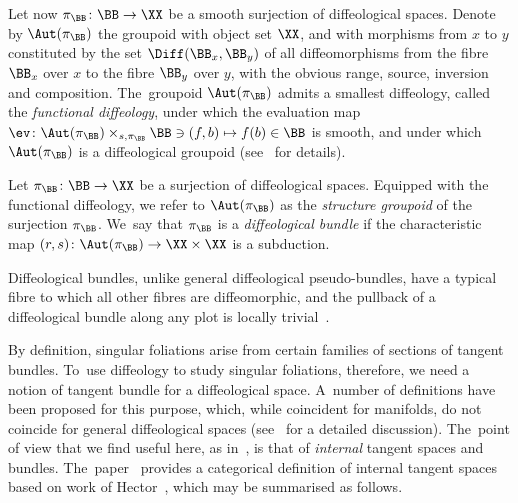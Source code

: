 Let now $\pi_{\BB}\colon \BB\rightarrow \XX$ be a smooth surjection of diffeological spaces. Denote by $\Aut(\pi_{\BB})$ the groupoid with object set $\XX$, and with morphisms from $x$ to $y$ constituted by the set $\Diff(\BB_{x},\BB_{y})$ of all diffeomorphisms from the fibre $\BB_{x}$ over $x$ to the fibre $\BB_{y}$ over $y$, with the obvious range, source, inversion and composition. The~groupoid $\Aut(\pi_{\BB})$ admits a smallest diffeology, called the \textit{functional diffeology}, under which the evaluation map $\ev\colon \Aut(\pi_{\BB})\times_{s,\pi_{\BB}}\BB\ni(f,b)\mapsto f(b)\in \BB$ is smooth, and under which $\Aut(\pi_{\BB})$ is a diffeological groupoid (see~\cite[Section~8.7]{diffeology} for details).

\begin{Definition}\label{structuregpd}
 Let $\pi_{\BB}\colon \BB\rightarrow \XX$ be a surjection of diffeological spaces. Equipped with the functional diffeology, we refer to $\Aut(\pi_{\BB})$ as the \textit{structure groupoid} of the surjection $\pi_{\BB}$. We~say that $\pi_{\BB}$ is a \textit{diffeological bundle} if the characteristic map $(r,s)\colon \Aut(\pi_{\BB})\rightarrow \XX\times \XX$ is a sub\-duction.
\end{Definition}

Diffeological bundles, unlike general diffeological pseudo-bundles, have a typical fibre to which all other fibres are diffeomorphic, and the pullback of a diffeological bundle along any plot is locally trivial~\cite[p.~240]{diffeology}.

By definition, singular foliations arise from certain families of sections of tangent bundles. To~use diffeology to study singular foliations, therefore, we need a notion of tangent bundle for a diffeological space. A~number of definitions have been proposed for this purpose, which, while coincident for manifolds, do not coincide for general diffeological spaces (see~\cite{cw} for a detailed discussion). The~point of view that we find useful here, as in~\cite{mac3}, is that of \textit{internal} tangent spaces and bundles. The~paper~\cite{cw} provides a categorical definition of internal tangent spaces based on work of Hector~\cite{hector}, which may be summarised as follows.

